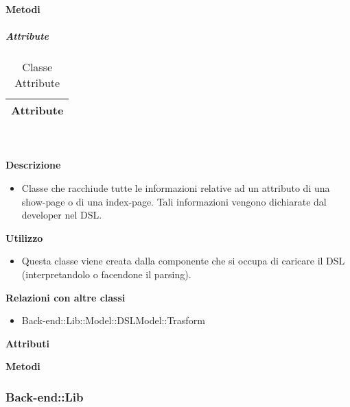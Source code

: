 		\textbf{Metodi} 
	\begin{itemize}
		\end{itemize}
			\subparagraph{Attribute} 
\begin{table}[ht]
\begin{center}
\bgroup
	\setlength{\arrayrulewidth}{0.6mm}
	\def\arraystretch{1}
		\begin{tabular}{ | p{12cm} | }
				\hline  
					\centerline{\textbf{Attribute}}
		\\ \hline 
				\hline
				\hline
		
		\end{tabular}
\egroup
\caption{Classe Attribute}
\end{center}
\end{table}  \textbf{\\ \\ Descrizione} 
					\begin{itemize}
						\item[] Classe che racchiude tutte le informazioni relative ad un attributo di una show-page o di una index-page. Tali informazioni vengono dichiarate dal developer nel DSL.
					\end{itemize}      
				\textbf{Utilizzo}  
					\begin{itemize}
						\item[] Questa classe viene creata dalla componente che si occupa di caricare il DSL (interpretandolo o facendone il parsing).
					\end{itemize}
					\textbf{Relazioni con altre classi}
					\begin{itemize}
							\item{Back-end::Lib::Model::DSLModel::Trasform}
					\end{itemize}
			 \textbf{Attributi} 
	\begin{itemize}
		\end{itemize}
		
		\textbf{Metodi} 
	\begin{itemize}
		\end{itemize}
	\subsubsection{Back-end::Lib} 
